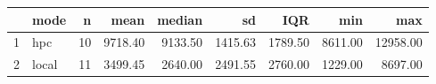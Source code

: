 \begin{table}[ht]
\centering
\begin{tabular}{rlrrrrrrr}
  \hline
 & mode & n & mean & median & sd & IQR & min & max \\ 
  \hline
1 & hpc &  10 & 9718.40 & 9133.50 & 1415.63 & 1789.50 & 8611.00 & 12958.00 \\ 
  2 & local &  11 & 3499.45 & 2640.00 & 2491.55 & 2760.00 & 1229.00 & 8697.00 \\ 
   \hline
\end{tabular}
\end{table}
